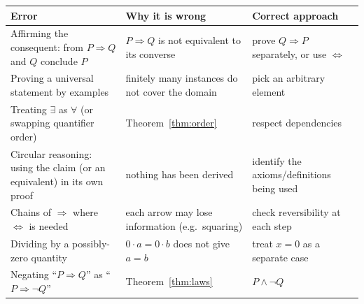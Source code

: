 \begin{center}
	\begin{tabular}{@{}p{4.2cm}p{5.4cm}p{5cm}@{}}
		\toprule
		\textbf{Error} & \textbf{Why it is wrong} & \textbf{Correct approach}\\
		\midrule
		Affirming the consequent: from $P\Rightarrow Q$ and $Q$ conclude $P$ & $P\Rightarrow Q$ is not equivalent to its converse & prove $Q\Rightarrow P$ separately, or use $\Leftrightarrow$\\
		Proving a universal statement by examples & finitely many instances do not cover the domain & pick an arbitrary element\\
		Treating $\exists$ as $\forall$ (or swapping quantifier order) & Theorem~\ref{thm:order} & respect dependencies\\
		Circular reasoning: using the claim (or an equivalent) in its own proof & nothing has been derived & identify the axioms/definitions being used\\
		Chains of $\Rightarrow$ where $\Leftrightarrow$ is needed & each arrow may lose information (e.g.\ squaring) & check reversibility at each step\\
		Dividing by a possibly-zero quantity & $0\cdot a=0\cdot b$ does not give $a=b$ & treat $x=0$ as a separate case\\
		Negating ``$P\Rightarrow Q$'' as ``$P\Rightarrow\neg Q$'' & Theorem~\ref{thm:laws} & $P\wedge\neg Q$\\
		\bottomrule
	\end{tabular}
\end{center}